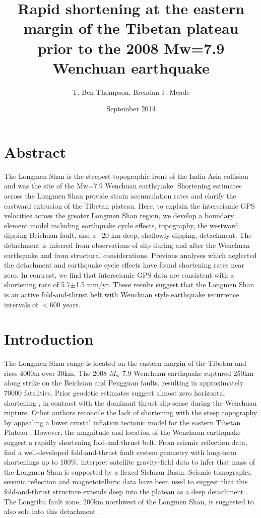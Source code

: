 \documentclass[12pt]{article}
\title{Rapid shortening at the eastern margin of the Tibetan plateau prior to the 2008 Mw=7.9 Wenchuan earthquake}
\author{T. Ben Thompson, Brendan J. Meade}
\date{September 2014}
\begin{document}
\maketitle

\section{Abstract}
The Longmen Shan is the steepest topographic front of the India-Asia collision and was the site of the Mw=7.9 Wenchuan earthquake. Shortening estimates across the Longmen Shan provide strain accumulation rates and clarify the eastward extrusion of the Tibetan plateau. Here, to explain the interseismic GPS velocities across the greater Longmen Shan region, we develop a boundary element model including earthquake cycle effects, topography, the westward dipping Beichuan fault, and a ~20 km deep, shallowly dipping, detachment. The detachment is inferred from observations of slip during and after the Wenchuan earthquake and from structural considerations. Previous analyses which neglected the detachment and earthquake cycle effects have found shortening rates near zero. In contrast, we find that interseismic GPS data are consistent with a shortening rate of 5.7$\pm$1.5 mm/yr. These results suggest that the Longmen Shan is an active fold-and-thrust belt with Wenchuan style earthquake recurrence intervals of $<$600 years.

\section{Introduction}
The Longmen Shan range is located on the eastern margin of the Tibetan and rises 4000m over 30km.  The 2008 $M_{\textrm{w}}$ 7.9 Wenchuan earthquake ruptured 250km along strike on the Beichuan and Pengguan faults, resulting in approximately 70000 fatalities. Prior geodetic estimates suggest almost zero horizontal shortening \citep{king97, chen00, shen05, Meade07c, Loveless2011}, in contrast with the dominant thrust slip-sense during the Wenchuan rupture.  Other authors reconcile the lack of shortening with the steep topography by appealing a lower crustal inflation tectonic model for the eastern Tibetan Plateau \citep{royden97, bird91, Burchfiel2008a}.  However, the magnitude and location of the Wenchuan earthquake suggest a rapidly shortening fold-and-thrust belt. From seismic reflection data, \citet{hubbard09} find a well-developed fold-and-thrust fault system geometry with long-term shortenings up to 100\%. \citet{Fielding2012a} interpret satellite gravity-field data to infer that mass of the Longmen Shan is supported by a flexed Sichuan Basin. Seismic tomography, seismic reflection and magnetotelluric data have been used to suggest that this fold-and-thrust structure extends deep into the plateau as a deep detachment \citep{Zhang2009, Zhao2012, Guo2013}. The Longriba fault zone, 200km northwest of the Longmen Shan, is suggested to also sole into this detachment \citep{Xu2008, Ren2013}.
\end{document}
